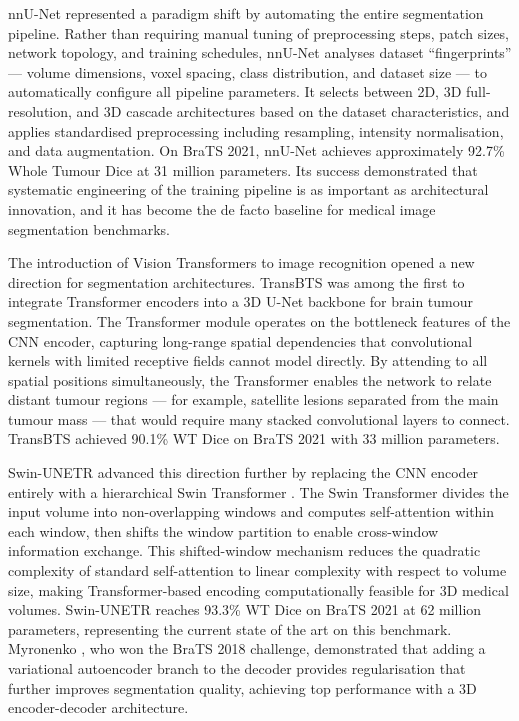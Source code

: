 \documentclass{article}
\begin{document}
nnU-Net \cite{isensee2021nnunet} represented a paradigm shift by automating
the entire segmentation pipeline. Rather than requiring manual tuning of
preprocessing steps, patch sizes, network topology, and training schedules,
nnU-Net analyses dataset ``fingerprints'' --- volume dimensions, voxel spacing,
class distribution, and dataset size --- to automatically configure all pipeline
parameters. It selects between 2D, 3D full-resolution, and 3D cascade
architectures based on the dataset characteristics, and applies standardised
preprocessing including resampling, intensity normalisation, and data
augmentation. On BraTS 2021, nnU-Net achieves approximately 92.7\% Whole
Tumour Dice at 31 million parameters. Its success demonstrated that systematic
engineering of the training pipeline is as important as architectural innovation,
and it has become the de facto baseline for medical image segmentation benchmarks.

The introduction of Vision Transformers \cite{dosovitskiy2021image} to image
recognition opened a new direction for segmentation architectures. TransBTS
\cite{wang2021transbts} was among the first to integrate Transformer encoders
into a 3D U-Net backbone for brain tumour segmentation. The Transformer module
operates on the bottleneck features of the CNN encoder, capturing long-range
spatial dependencies that convolutional kernels with limited receptive fields
cannot model directly. By attending to all spatial positions simultaneously,
the Transformer enables the network to relate distant tumour regions ---
for example, satellite lesions separated from the main tumour mass --- that
would require many stacked convolutional layers to connect. TransBTS achieved
90.1\% WT Dice on BraTS 2021 with 33 million parameters.

Swin-UNETR \cite{hatamizadeh2022swin} advanced this direction further by
replacing the CNN encoder entirely with a hierarchical Swin Transformer
\cite{liu2021swin}. The Swin Transformer divides the input volume into
non-overlapping windows and computes self-attention within each window,
then shifts the window partition to enable cross-window information exchange.
This shifted-window mechanism reduces the quadratic complexity of standard
self-attention to linear complexity with respect to volume size, making
Transformer-based encoding computationally feasible for 3D medical volumes.
Swin-UNETR reaches 93.3\% WT Dice on BraTS 2021 at 62 million parameters,
representing the current state of the art on this benchmark. Myronenko
\cite{myronenko2019brats}, who won the BraTS 2018 challenge, demonstrated
that adding a variational autoencoder branch to the decoder provides
regularisation that further improves segmentation quality, achieving top
performance with a 3D encoder-decoder architecture.
\end{document}
